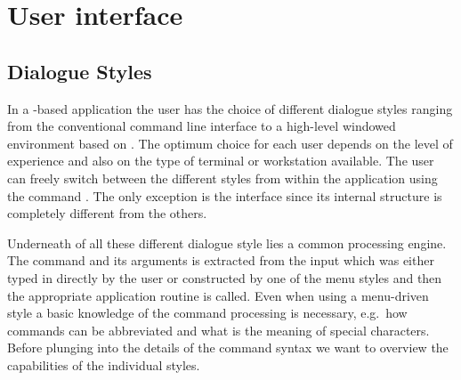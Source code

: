 
\newif\ifVECTOR \VECTORfalse %

\ifPAWman
\VECTORtrue
\def\PROMPT{\Lit{PAW >}}
\fi
\ifKUIPman
\VECTORtrue
\def\PROMPT{\Lit{KUIP >}}
\fi

\ifKUIPman

\chapter{User interface}
%
%
\section{Dialogue Styles}

In a \KUIP{}-based application the user has the choice of
different dialogue styles ranging from the conventional command line
interface to a high-level windowed environment based on \OSFMotif{}.
The optimum choice for each user depends on the level of experience
and also on the type of terminal or workstation available.
The user can freely switch between the different styles from within
the application using the command .
The only exception is the \Motif{} interface since its internal structure
is completely different from the others.

Underneath of all these different dialogue style lies a common
processing engine.
The command and its arguments is extracted from the input which was
either typed in directly by the user or constructed by one of the menu
styles and then the appropriate application routine is called.
Even when using a menu-driven style a basic knowledge of the command
processing is necessary, e.g.\ how commands can be abbreviated and what is the
meaning of special characters.
Before plunging into the details of the command syntax we want to
overview the capabilities of the individual styles.


